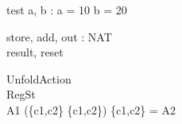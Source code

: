 \documentclass{llncs}
\begin{document}
\begin{schema}{test}
a, b : \nat
\where
a = 10 \land b = 20
\end{schema}
\begin{circus}
\circchannel store, add, out : NAT\\
\circchannel result, reset\\
\end{circus}
\begin{circus}
\circprocess UnfoldAction \circdef\\
	\circbegin \circstate RegSt \\
	A1 \circdef \lcircguard (\{c1,c2\} \cup \{c1,c2\}) \cap \{c1,c2\} = \emptyset \rcircguard \circguard A2
\circspot \Skip
	\circend\\
\end{circus}
\end{document}
